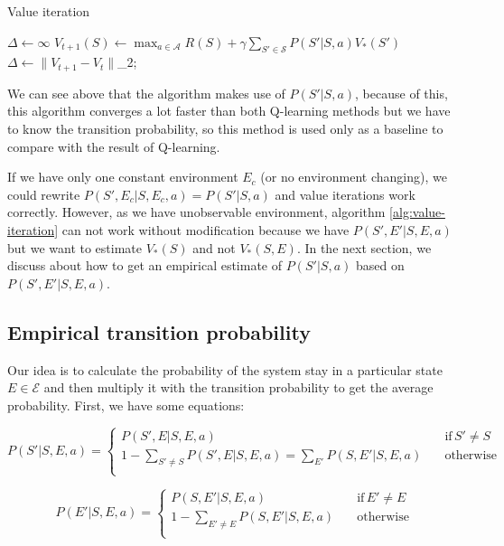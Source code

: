 \documentclass[
  a4paper, xcolor = usenames,dvipsnames]{article}
\theoremstyle{definition}
\theoremstyle{definition}
\theoremstyle{definition}
\theoremstyle{definition}
\theoremstyle{remark}
\begin{document}
\begin{algorithm}
\caption{Value iteration} \label{alg:value-iteration}
$\Delta \gets \infty$\;
\While {\Delta > \epsilon} {
   {
    $V_{t+1}(S) \gets \max_{a \in \mathcal{A}} R(S) + \gamma \sum_{S' \in \mathcal{S}} P(S' | S, a) V_{*}(S')$\;
  }
  $\Delta \gets \lVert V_{t + 1} - V_{t} \rVert$\_{2};
}
\end{algorithm}

We can see above that the algorithm makes use of \(P(S' | S, a)\), because of this, this algorithm converges a lot faster than both Q-learning methods but we have to know the transition probability, so this method is used only as a baseline to compare with the result of Q-learning.

If we have only one constant environment \(E_{c}\) (or no environment changing), we could rewrite \(P(S', E_{c} | S, E_{c}, a) = P(S' | S, a)\) and value iterations work correctly. However, as we have unobservable environment, algorithm \ref{alg:value-iteration} can not work without modification because we have \(P(S', E' | S, E, a)\) but we want to estimate \(V_{*}(S)\) and not \(V_{*}(S, E)\). In the next section, we discuss about how to get an empirical estimate of \(P(S'|S, a)\) based on \(P(S', E' | S, E, a)\).

\hypertarget{empirical-transition-probability}{%
\subsection{Empirical transition probability}\label{empirical-transition-probability}}

Our idea is to calculate the probability of the system stay in a particular state \(E \in \mathcal{E}\) and then multiply it with the transition probability to get the average probability. First, we have some equations:

\begin{equation}
  P(S'|S, E, a) = 
    \begin{cases}
        P(S', E|S, E, a) \quad & \text{if} \, S' \neq S \\
        1 - \sum_{S' \neq S} P(S', E|S, E, a) = \sum_{E'} P(S, E'|S, E, a) \quad & \text{otherwise} \\
    \end{cases}
\label{eq:p-s}
\end{equation}

\begin{equation}
  P(E'|S, E, a) = 
    \begin{cases}
        P(S, E'|S, E, a) \quad & \text{if} \, E' \neq E \\
        1 - \sum_{E' \neq E} P(S, E'|S, E, a) \quad & \text{otherwise} \\
    \end{cases}
\label{eq:p-e}
\end{equation}
\end{document}

